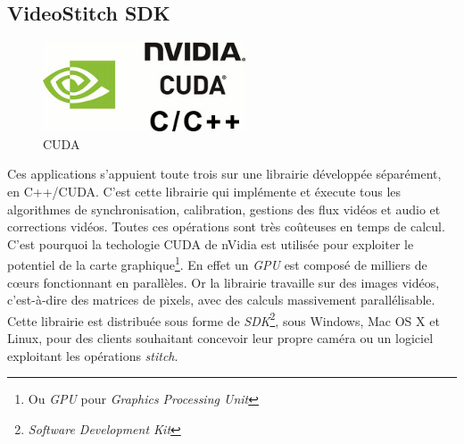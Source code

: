 \subsection{VideoStitch SDK}
\label{videostitch-sdk-section}
\begin{figure}
  \centering
  \includegraphics[width=6cm]{images/cuda.jpg}
  \caption{CUDA}
\end{figure}
Ces applications s'appuient toute trois sur une librairie développée séparément,
en C++/CUDA. C'est cette librairie qui implémente et éxecute tous les algorithmes
de synchronisation, calibration, gestions des flux vidéos et audio et corrections
vidéos.
Toutes ces opérations sont très coûteuses en temps de calcul. C'est pourquoi
la techologie CUDA de nVidia est utilisée pour exploiter le potentiel de la carte
graphique\footnote{Ou \textit{GPU} pour \textit{Graphics Processing Unit}}. 
En effet un \textit{GPU} est composé de milliers de c\oe urs fonctionnant en parallèles.
Or la librairie travaille sur des images vidéos, c'est-à-dire des matrices de pixels,
avec des calculs massivement parallélisable\cite{videostitch-cuda}.\\
\newline
Cette librairie est distribuée sous forme de \textit{SDK}\footnote{\textit{Software Development Kit}}, sous Windows, Mac OS X et Linux, 
pour des clients souhaitant concevoir leur propre caméra ou un logiciel exploitant
les opérations \textit{stitch}.

